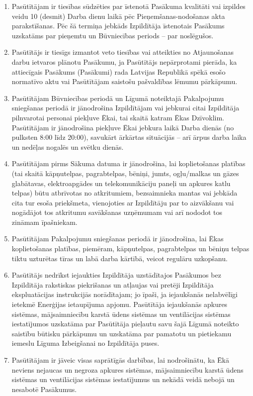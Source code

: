 \begin{multicols}{2}
\begin{enumerate}
	\item Pasūtītājam ir tiesības sūdzēties par īstenotā Pasākuma kvalitāti vai izpildes veidu 10 (desmit) Darba dienu laikā pēc Pieņemšanas-nodošanas akta parakstīšanas. Pēc šā termiņa jebkāds Izpildītāja īstenotais Pasākums uzskatāms par pieņemtu un Būvniecības periods – par noslēgušos.
	\item Pasūtītājs ir tiesīgs izmantot veto tiesības vai atteikties no Atjaunošanas darbu ietvaros plānotu Pasākumu, ja Pasūtītājs nepārprotami pierāda, ka attiecīgais Pasākums (Pasākumi) rada  Latvijas Republikā spēkā esošo normatīvo aktu vai Pasūtītājam saistošu pašvaldības lēmumu pārkāpumu.
	\item Pasūtītājam Būvniecības periodā un Līgumā noteiktajā Pakalpojumu sniegšanas periodā ir jānodrošina Izpildītājam vai jebkurai citai Izpildītāja pilnvarotai personai piekļuve Ēkai, tai skaitā katram Ēkas Dzīvoklim. Pasūtītājam ir jānodrošina piekļuve Ēkai jebkura laikā Darba dienās (no pulksten 8:00 līdz 20:00), savukārt ārkārtas situācijās – arī ārpus darba laika un nedēļas nogalēs un svētku dienās.
	\item Pasūtītājam pirms Sākuma datuma ir jānodrošina, lai koplietošanas platības (tai skaitā kāpņutelpas, pagrabtelpas, bēniņi, jumts, ogļu/malkas un gāzes glabātavas, elektroapgādes un telekomunikāciju paneļi un apkures katlu telpas) būtu atbrīvotas no atkritumiem, bezsaimnieka mantas vai jebkāda cita tur esoša priekšmeta, vienojoties ar Izpildītāju par to aizvākšanu vai nogādājot tos atkritumu savākšanas uzņēmumam vai arī nododot tos zināmam īpašniekam.
	\item Pasūtītājam Pakalpojumu sniegšanas periodā ir jānodrošina, lai Ēkas koplietošanas platības, piemēram, kāpņutelpas, pagrabtelpas un bēniņu telpas tiktu uzturētas tīras un labā darba kārtībā, veicot regulāru uzkopšanu.
	\item Pasūtītājs nedrīkst iejaukties Izpildītāja uzstādītajos Pasākumos bez Izpildītāja rakstiskas piekrišanas un atļaujas vai pretēji Izpildītāja ekspluatācijas instrukcijās norādītajam; jo īpaši, ja iejaukšanās nelabvēlīgi ietekmē Enerģijas ietaupījuma apjomu. Pasūtītāja iejaukšanās apkures sistēmas, mājsaimniecību karstā ūdens sistēmas un ventilācijas sistēmas iestatījumos uzskatāma par Pasūtītāja pieļautu savu šajā Līgumā noteikto saistību būtisku pārkāpumu un uzskatāma par pamatotu un pietiekamu iemeslu Līguma Izbeigšanai no Izpildītāja puses.
	\item Pasūtītājam ir jāveic visas saprātīgās darbības, lai nodrošinātu, ka Ēkā neviens nejaucas un negroza apkures sistēmas, mājsaimniecību karstā ūdens sistēmas un ventilācijas sistēmas iestatījumus un nekādā veidā nebojā un nesabotē Pasākumus.

\end{enumerate}
\end{multicols}
